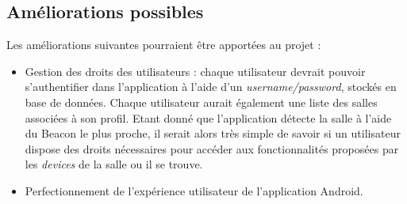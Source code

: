 \subsection{Améliorations possibles}
Les améliorations suivantes pourraient être apportées au projet :
\begin{itemize}
    \item Gestion des droits des utilisateurs : chaque utilisateur devrait pouvoir s'authentifier dans l'application à l'aide d'un \textit{username/password}, stockés en base de données. Chaque utilisateur aurait également une liste des salles associées à son profil. Etant donné que l'application détecte la salle à l'aide du Beacon le plus proche, il serait alors très simple de savoir si un utilisateur dispose des droits nécessaires pour accéder aux fonctionnalités proposées par les \textit{devices} de la salle ou il se trouve.
    \item Perfectionnement de l'expérience utilisateur de l'application Android.
\end{itemize}
